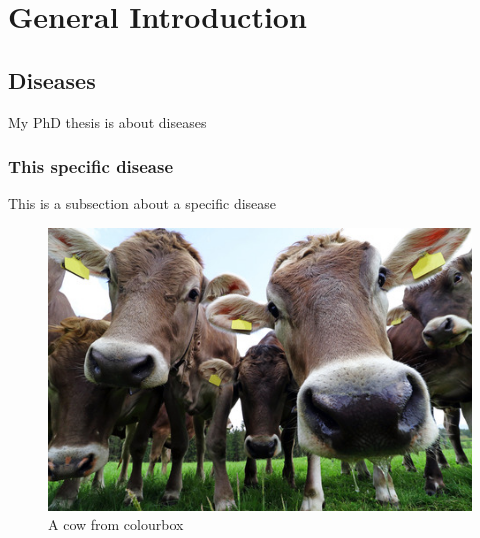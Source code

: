 \chapter{General Introduction}
\label{chap:intro}


\section{Diseases}
My PhD thesis is about diseases



\subsection{This specific disease}
This is a subsection about a specific disease


\begin{figure}[htp]
    \centering
    \includegraphics[width=12cm]{figures/cows_closeup.jpg}
    \caption{A cow from colourbox}
    \label{fig:cow}
\end{figure}




